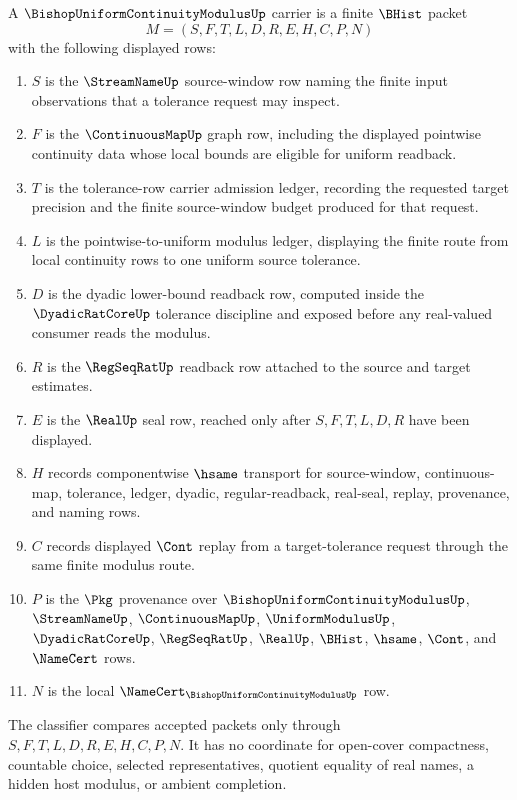 \begin{definition}
\label{def:bishop-uniform-continuity-modulus-carrier}
A $\BishopUniformContinuityModulusUp$ carrier is a finite $\BHist$ packet
$$
M=(S,F,T,L,D,R,E,H,C,P,N)
$$
with the following displayed rows:
\begin{enumerate}
\item $S$ is the $\StreamNameUp$ source-window row naming the finite input observations that a tolerance request may inspect.
\item $F$ is the $\ContinuousMapUp$ graph row, including the displayed pointwise continuity data whose local bounds are eligible for uniform readback.
\item $T$ is the tolerance-row carrier admission ledger, recording the requested target precision and the finite source-window budget produced for that request.
\item $L$ is the pointwise-to-uniform modulus ledger, displaying the finite route from local continuity rows to one uniform source tolerance.
\item $D$ is the dyadic lower-bound readback row, computed inside the $\DyadicRatCoreUp$ tolerance discipline and exposed before any real-valued consumer reads the modulus.
\item $R$ is the $\RegSeqRatUp$ readback row attached to the source and target estimates.
\item $E$ is the $\RealUp$ seal row, reached only after $S,F,T,L,D,R$ have been displayed.
\item $H$ records componentwise $\hsame$ transport for source-window, continuous-map, tolerance, ledger, dyadic, regular-readback, real-seal, replay, provenance, and naming rows.
\item $C$ records displayed $\Cont$ replay from a target-tolerance request through the same finite modulus route.
\item $P$ is the $\Pkg$ provenance over $\BishopUniformContinuityModulusUp$, $\StreamNameUp$, $\ContinuousMapUp$, $\UniformModulusUp$, $\DyadicRatCoreUp$, $\RegSeqRatUp$, $\RealUp$, $\BHist$, $\hsame$, $\Cont$, and $\NameCert$ rows.
\item $N$ is the local $\NameCert_{\BishopUniformContinuityModulusUp}$ row.
\end{enumerate}
The classifier compares accepted packets only through $S,F,T,L,D,R,E,H,C,P,N$. It has no coordinate for open-cover compactness, countable choice, selected representatives, quotient equality of real names, a hidden host modulus, or ambient completion.
\end{definition}

